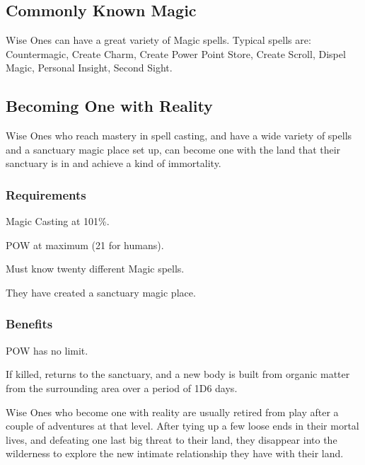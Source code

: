 \subsection{Commonly Known Magic}
Wise Ones can have a great variety of Magic spells. Typical spells are: Countermagic, Create Charm, Create Power Point Store, Create Scroll, Dispel Magic, Personal Insight, Second Sight.


\subsection{Becoming One with Reality}
Wise Ones who reach mastery in spell casting, and have a wide variety of spells and a sanctuary magic place set up, can become one with the land that their sanctuary is in and achieve a kind of immortality.

\subsubsection{Requirements}
\begin{rpg-list}
\item Magic Casting at 101\%.
\item POW at maximum (21 for humans).
\item Must know twenty different Magic spells.
\item They have created a sanctuary magic place.
\end{rpg-list}

\subsubsection{Benefits}
\begin{rpg-list}
\item POW has no limit.
\item If killed, returns to the sanctuary, and a new body is built from organic matter from the surrounding area over a period of 1D6 days.
\end{rpg-list}

Wise Ones who become one with reality are usually retired from play after a couple of adventures at that level. After tying up a few loose ends in their mortal lives, and defeating one last big threat to their land, they disappear into the wilderness to explore the new intimate relationship they have with their land.



